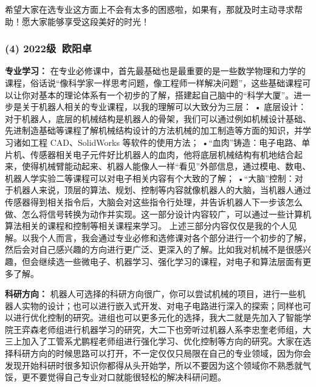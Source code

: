 \documentclass[11pt,oneside]{book}
\begin{document}
希望大家在选专业这方面上不会有太多的困惑啦，如果有，那就及时主动寻求帮助！愿大家能够享受这段美好的时光！

\subsubsection{ (4) 2022级\ 欧阳卓}
\textbf{专业学习：}
在专业必修课中，首先最基础也是最重要的是一些数学物理和力学的课程，俗话说“像科学家一样思考问题，像工程师一样解决问题”，这些基础课程可以让你对基本的理论体系有一个初步的了解，搭建起自己脑中的“科学大厦”。进一步是关于机器人相关的专业课程，以我的理解可以大致分为三层：
	• 底层设计：对于机器人，底层的机械结构是机器人的骨架，我们可以通过例如机械设计基础、先进制造基础等课程了解机械结构设计的方法机械的加工制造等方面的知识，并学习诸如工程 CAD、SolidWorks 等软件的使用方法；
	•“血肉”铸造：电子电路、单片机、传感器相关电子元件好比机器人的血肉，他将底层机械结构有机地结合起来，使得机械臂能动起来、机器人能像人一样“看见”外部信息，通过模电、数电、机器人学实验二等课程可以对电子相关内容有个大致的了解；
	•“大脑”控制：对于机器人来说，顶层的算法、规划、控制等内容就像机器人的大脑，当机器人通过传感器得到相关指令后，大脑会对这些指令行处理，并告诉机器人下一步该怎么做、怎么将信号转换为动作并实现。这一部分设计内容较广，可以通过一些计算机算法相关的课程和控制等相关课程来学习。
上述三部分内容仅仅是我的个人见解。以我个人而言，我会通过专业必修和选修课对各个部分进行一个初步的了解，然后会对自己感兴趣的方向进行更广泛、更深入的了解。比如我对机械不是很感兴趣，但会继续选一些微电子、机器学习、强化学习的课程，对电子和算法层面有更多了解。

\textbf{科研方向：}
机器人可选择的科研方向很广，你可以尝试机械的项目，进行一些机器人实物的设计；也可以进行嵌入式开发、对电子电路进行深入的探索；同样也可以进行优化控制的研究。进组也可以更多元化的选择，我大二就是先加入了智能学院王弈森老师组进行机器学习的研究，大二下也旁听过机器人系李忠奎老师组，大三上加入了工管系尤鹏程老师组进行强化学习、优化控制等方向的研究。大家在选择科研方向的时候思路可以打开，不一定仅仅只局限在自己的专业领域，因为你会发现开始科研时很多知识你都得从头开始学，所以不要因为这个领域你不熟悉就气馁，更不要觉得自己专业对口就能很轻松的解决科研问题。
\end{document}
